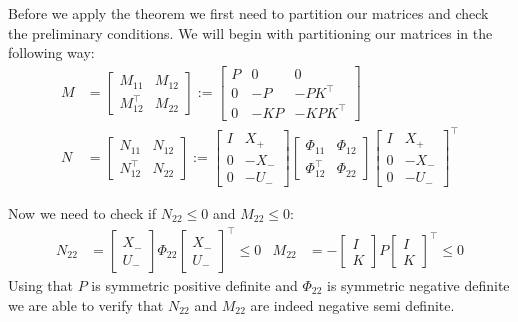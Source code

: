 Before we apply the theorem we first need to partition our matrices and check the preliminary conditions. We will begin with partitioning our matrices in the following way:
\begin{subequations} \label{NData}
	\begin{align} 
		M &= 
		\left[ \begin{array}{c|c}
			M_{11} & M_{12} \\ \hline M_{12}^\top & M_{22}
		\end{array} \right] 
		:=
		\left[ \begin{array}{c|cc}
		P&0&0 \\ \hline 0 & -P & -PK^\top \\ 0 & -KP & -KPK^\top
		\end{array} \right] \\
		N &= 
		\left[ \begin{array}{c|c}
			N_{11} & N_{12} \\ \hline N_{12}^\top & N_{22}
		\end{array} \right] 
		:=
		\left[ \begin{array}{cc}
			I&X_+ \\ \hline 0 & -X_- \\ 0&-U_-
		\end{array} \right]
		\left[ \begin{array}{cc}
			\Phi_{11} & \Phi_{12} \\ \Phi_{12}^\top & \Phi_{22}
		\end{array} \right]
		\left[ \begin{array}{cc}
			I&X_+ \\ \hline 0 & -X_- \\ 0&-U_-
		\end{array} \right]^\top
	\end{align}
\end{subequations}

Now we need to check if $N_{22} \leq 0$ and $M_{22} \leq 0$:
\begin{align*}
	N_{22} &= \begin{bmatrix} X_- \\ U_- \end{bmatrix} \Phi_{22} \begin{bmatrix} X_- \\ U_- \end{bmatrix}^\top \leq 0 &
	M_{22} &= - \begin{bmatrix} I \\ K \end{bmatrix} P \begin{bmatrix} I \\ K \end{bmatrix}^\top \leq 0
\end{align*}
Using that $P$ is symmetric positive definite and $\Phi_{22}$ is symmetric negative definite we are able to verify that $N_{22}$ and $M_{22}$ are indeed negative semi definite.

